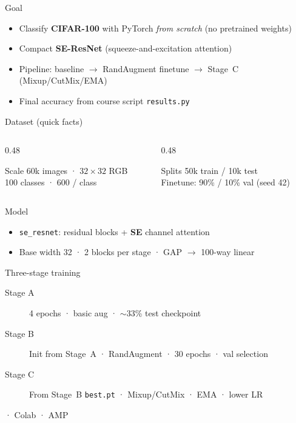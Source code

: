 \documentclass[aspectratio=169]{beamer}
\begin{document}
\begin{frame}{Goal}
    \begin{itemize}
        \item Classify \textbf{CIFAR-100} with PyTorch \emph{from scratch} (no pretrained weights)
        \item Compact \textbf{SE-ResNet} (squeeze-and-excitation attention)
        \item Pipeline: baseline $\rightarrow$ RandAugment finetune $\rightarrow$ Stage~C (Mixup/CutMix/EMA)
        \item Final accuracy from course script \texttt{results.py}
    \end{itemize}
\end{frame}

\begin{frame}{Dataset (quick facts)}
    \begin{columns}[T,onlytextwidth]
        \begin{column}{0.48\textwidth}
            \begin{block}{Scale}
                60k images · $32{\times}32$ RGB \\
                100 classes · 600 / class
            \end{block}
        \end{column}
        \begin{column}{0.48\textwidth}
            \begin{block}{Splits}
                50k train / 10k test \\
                Finetune: 90\% / 10\% val (seed 42)
            \end{block}
        \end{column}
    \end{columns}
\end{frame}

\begin{frame}{Model}
    \begin{itemize}
        \item \texttt{se\_resnet}: residual blocks + \textbf{SE} channel attention
        \item Base width 32 · 2 blocks per stage · GAP $\rightarrow$ 100-way linear
    \end{itemize}
\end{frame}

\begin{frame}{Three-stage training}
    \begin{description}
        \item[Stage A] 4 epochs · basic aug · $\sim$33\% test checkpoint
        \item[Stage B] Init from Stage~A · RandAugment · 30 epochs · val selection
        \item[Stage C] From Stage~B \texttt{best.pt} · Mixup/CutMix · EMA · lower LR
    \end{description}
    \vspace{0.5em}
    \small {} · Colab · AMP
\end{frame}
\end{document}
